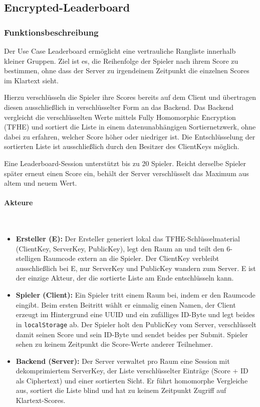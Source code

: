 \subsection{Encrypted-Leaderboard}
\label{sub:encrypted_leaderboard}

\subsubsection{Funktionsbeschreibung}

Der Use Case Leaderboard ermöglicht eine vertrauliche Rangliste innerhalb kleiner Gruppen. Ziel ist es, die Reihenfolge der Spieler nach ihrem Score zu bestimmen, ohne dass der Server zu irgendeinem Zeitpunkt die einzelnen Scores im Klartext sieht.

Hierzu verschlüsseln die Spieler ihre Scores bereits auf dem Client und übertragen diesen ausschließlich in verschlüsselter Form an das Backend. Das Backend vergleicht die verschlüsselten Werte mittels Fully Homomorphic Encryption (TFHE) und sortiert die Liste in einem datenunabhängigen Sortiernetzwerk, ohne dabei zu erfahren, welcher Score höher oder niedriger ist. Die Entschlüsselung der sortierten Liste ist ausschließlich durch den Besitzer des ClientKeys möglich.

Eine Leaderboard-Session unterstützt bis zu 20 Spieler. Reicht derselbe Spieler später erneut einen Score ein, behält der Server verschlüsselt das Maximum aus altem und neuem Wert.

\paragraph{Akteure}\mbox{}\\
\begin{itemize}
    \item \textbf{Ersteller (E):} Der Ersteller generiert lokal das TFHE-Schlüsselmaterial (ClientKey, ServerKey, PublicKey), legt den Raum an und teilt den 6-stelligen Raumcode extern an die Spieler. Der ClientKey verbleibt ausschließlich bei E, nur ServerKey und PublicKey wandern zum Server. E ist der einzige Akteur, der die sortierte Liste am Ende entschlüsseln kann.
    \item \textbf{Spieler (Client):} Ein Spieler tritt einem Raum bei, indem er den Raumcode eingibt. Beim ersten Beitritt wählt er einmalig einen Namen, der Client erzeugt im Hintergrund eine UUID und ein zufälliges ID-Byte und legt beides in \texttt{localStorage} ab. Der Spieler holt den PublicKey vom Server, verschlüsselt damit seinen Score und sein ID-Byte und sendet beides per Submit. Spieler sehen zu keinem Zeitpunkt die Score-Werte anderer Teilnehmer.
    \item \textbf{Backend (Server):} Der Server verwaltet pro Raum eine Session mit dekomprimiertem ServerKey, der Liste verschlüsselter Einträge (Score + ID als Ciphertext) und einer sortierten Sicht. Er führt homomorphe Vergleiche aus, sortiert die Liste blind und hat zu keinem Zeitpunkt Zugriff auf Klartext-Scores.
\end{itemize}

